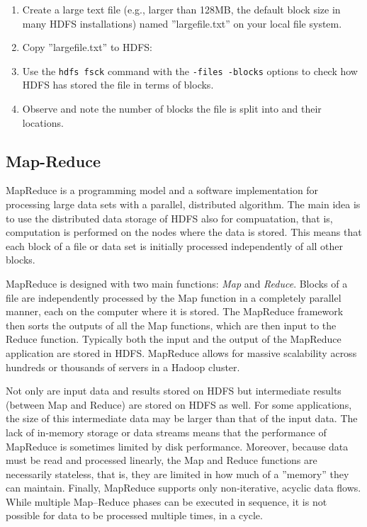 \begin{withcode}
\begin{exerciseboxcomputer}
\begin{enumerate}
  \item Create a large text file (e.g., larger than 128MB, the default block size in many HDFS installations) named ''largefile.txt'' on your local file system.
  \item Copy ''largefile.txt'' to HDFS:
  \item Use the \texttt{hdfs fsck} command with the \texttt{-files -blocks} options to check how HDFS has stored the file in terms of blocks.
  \item Observe and note the number of blocks the file is split into and their locations.
\end{enumerate}

\end{exerciseboxcomputer}
\end{withcode}

\subsection{Map-Reduce}

MapReduce is a programming model and a software implementation for processing large data sets with a parallel, distributed algorithm. The main idea is to use the distributed data storage of HDFS also for compuatation, that is, computation is performed on the nodes where the data is stored. This means that each block of a file or data set is initially processed independently of all other blocks.

MapReduce is designed with two main functions: \emph{Map} and \emph{Reduce}. Blocks of a file are independently processed by the Map function in a completely parallel manner, each on the computer where it is stored. The MapReduce framework then sorts the outputs of all the Map functions, which are then input to the Reduce function. Typically both the input and the output of the MapReduce application are stored in HDFS. MapReduce allows for massive scalability across hundreds or thousands of servers in a Hadoop cluster.

Not only are input data and results stored on HDFS but intermediate results (between Map and Reduce) are stored on HDFS as well. For some applications, the size of this intermediate data may be larger than that of the input data. The lack of in-memory storage or data streams means that the performance of MapReduce is sometimes limited by disk performance. Moreover, because data must be read and processed linearly, the Map and Reduce functions are necessarily stateless, that is, they are limited in how much of a ''memory'' they can maintain. Finally, MapReduce supports only non-iterative, acyclic data flows. While multiple Map--Reduce phases can be executed in sequence, it is not possible for data to be processed multiple times, in a cycle. 

